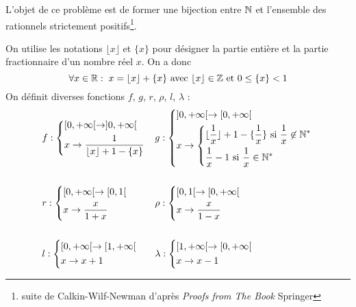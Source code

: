 L'objet de ce problème est de former une bijection entre $\mathbb{N}$ et l'ensemble des rationnels strictement positifs\footnote{suite de Calkin-Wilf-Newman d'après \emph{Proofs from The Book} Springer}.

On utilise les notations $\lfloor x \rfloor$ et $\{x\}$ pour désigner la partie entière et la partie fractionnaire d'un nombre réel $x$. On a donc
\begin{displaymath}
 \forall x\in \mathbb{R} : \;x= \lfloor x \rfloor + \{x\} \text{ avec } \lfloor x \rfloor\in \mathbb{Z} \text{ et } 0\leq \{x\}<1
\end{displaymath}
On définit diverses fonctions $f$, $g$, $r$, $\rho$, $l$, $\lambda$ :
\begin{align*}
 &f:
\left\lbrace
\begin{aligned}
   & [0,+\infty[ \rightarrow ]0,+\infty[   \\
   & x \rightarrow \frac{1}{\lfloor x \rfloor + 1 - \{x\}}
\end{aligned}
\right. 
& 
&g:\left\lbrace 
\begin{aligned}
 &]0,+\infty[ \rightarrow [0,+\infty[\\
 &x \rightarrow 
      \left\lbrace 
         \begin{aligned}
               &\lfloor \frac{1}{x} \rfloor + 1 - \{\frac{1}{x}\} \text{ si } \frac{1}{x}\not\in \mathbb{N}^* \\
               &\frac{1}{x} - 1  \text{ si } \frac{1}{x}\in \mathbb{N}^* 
         \end{aligned}
      \right. 
\end{aligned}
\right. \\ \\
&r:
\left\lbrace  
\begin{aligned}
 &[0,+\infty[ \rightarrow [0,1[ \\
 &x \rightarrow \frac{x}{1+x}
\end{aligned}
\right. 
& 
&\rho:
\left\lbrace  
\begin{aligned}
 &[0,1[ \rightarrow [0,+\infty[ \\
 &x \rightarrow \frac{x}{1-x}
\end{aligned}
\right. \\ \\
&l:
\left\lbrace  
\begin{aligned}
 &[0,+\infty[ \rightarrow [1,+\infty[ \\
 &x \rightarrow x+1
\end{aligned}
\right. 
& 
&\lambda:
\left\lbrace  
\begin{aligned}
 &[1,+\infty[ \rightarrow [0,+\infty[ \\
 &x \rightarrow x-1
\end{aligned}
\right. 
\end{align*}
